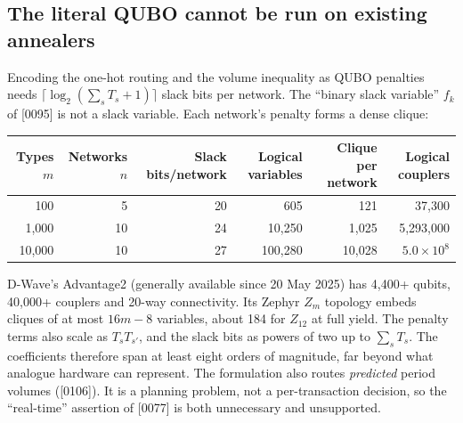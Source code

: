 \documentclass[10pt,a4paper]{article}
\begin{document}
\subsection{The literal QUBO cannot be run on existing annealers}
Encoding the one-hot routing and the volume inequality as QUBO penalties needs $\lceil\log_2(\sum_sT_s+1)\rceil$ slack bits per network. The ``binary slack variable'' $f_k$ of [0095] is not a slack variable. Each network's penalty forms a dense clique:
\begin{center}
\begin{tabular}{rrrrrr}
\toprule
Types $m$ & Networks $n$ & Slack bits/network & Logical variables & Clique per network & Logical couplers \\
\midrule
100 & 5 & 20 & 605 & 121 & 37,300 \\
1,000 & 10 & 24 & 10,250 & 1,025 & 5,293,000 \\
10,000 & 10 & 27 & 100,280 & 10,028 & $5.0\times10^{8}$ \\
\bottomrule
\end{tabular}
\end{center}
D-Wave's Advantage2 (generally available since 20 May 2025) has 4,400+ qubits, 40,000+ couplers and 20-way connectivity. Its Zephyr $Z_m$ topology embeds cliques of at most $16m-8$ variables, about 184 for $Z_{12}$ at full yield. The penalty terms also scale as $T_sT_{s'}$, and the slack bits as powers of two up to $\sum_sT_s$. The coefficients therefore span at least eight orders of magnitude, far beyond what analogue hardware can represent. The formulation also routes \emph{predicted} period volumes ([0106]). It is a planning problem, not a per-transaction decision, so the ``real-time'' assertion of [0077] is both unnecessary and unsupported.
\end{document}
